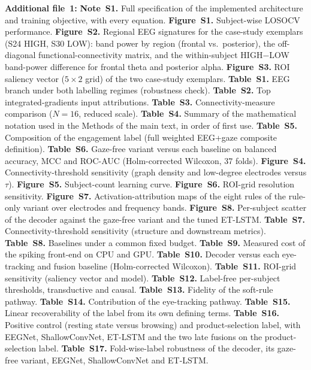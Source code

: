 \noindent\textbf{Additional file~1:} \textbf{Note~S1.} Full specification of the implemented architecture and training objective, with every equation. \textbf{Figure~S1.} Subject-wise LOSOCV performance. \textbf{Figure~S2.} Regional EEG signatures for the case-study exemplars (S24 HIGH, S30 LOW): band power by region (frontal vs.\ posterior), the off-diagonal functional-connectivity matrix, and the within-subject HIGH$-$LOW band-power difference for frontal theta and posterior alpha. \textbf{Figure~S3.} ROI saliency vector ($5\times2$ grid) of the two case-study exemplars. \textbf{Table~S1.} EEG branch under both labelling regimes (robustness check). \textbf{Table~S2.} Top integrated-gradients input attributions. \textbf{Table~S3.} Connectivity-measure comparison ($N=16$, reduced scale). \textbf{Table~S4.} Summary of the mathematical notation used in the Methods of the main text, in order of first use. \textbf{Table~S5.} Composition of the engagement label (full weighted EEG+gaze composite definition). \textbf{Table~S6.} Gaze-free variant versus each baseline on balanced accuracy, MCC and ROC-AUC (Holm-corrected Wilcoxon, 37 folds). \textbf{Figure~S4.} Connectivity-threshold sensitivity (graph density and low-degree electrodes versus $\tau$). \textbf{Figure~S5.} Subject-count learning curve. \textbf{Figure~S6.} ROI-grid resolution sensitivity. \textbf{Figure~S7.} Activation-attribution maps of the eight rules of the rule-only variant over electrodes and frequency bands. \textbf{Figure~S8.} Per-subject scatter of the decoder against the gaze-free variant and the tuned ET-LSTM. \textbf{Table~S7.} Connectivity-threshold sensitivity (structure and downstream metrics). \textbf{Table~S8.} Baselines under a common fixed budget. \textbf{Table~S9.} Measured cost of the spiking front-end on CPU and GPU. \textbf{Table~S10.} Decoder versus each eye-tracking and fusion baseline (Holm-corrected Wilcoxon). \textbf{Table~S11.} ROI-grid sensitivity (saliency vector and model). \textbf{Table~S12.} Label-free per-subject thresholds, transductive and causal. \textbf{Table~S13.} Fidelity of the soft-rule pathway. \textbf{Table~S14.} Contribution of the eye-tracking pathway. \textbf{Table~S15.} Linear recoverability of the label from its own defining terms. \textbf{Table~S16.} Positive control (resting state versus browsing) and product-selection label, with EEGNet, ShallowConvNet, ET-LSTM and the two late fusions on the product-selection label. \textbf{Table~S17.} Fold-wise-label robustness of the decoder, its gaze-free variant, EEGNet, ShallowConvNet and ET-LSTM.

